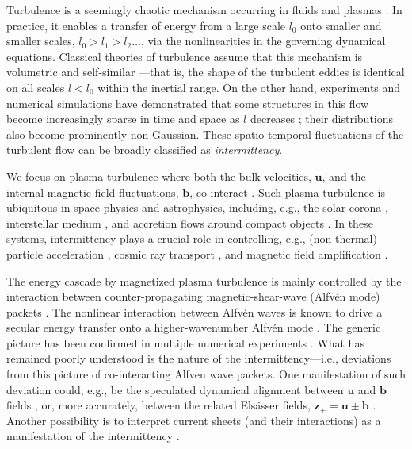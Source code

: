Turbulence is a seemingly chaotic mechanism occurring in fluids and plasmas \citep{davidson_turbulence_2015, biskamp_magnetohydrodynamic_2003}.
In practice, it enables a transfer of energy from a large scale $l_0$ onto smaller and smaller scales, $l_0 > l_1 > l_2 \ldots$, via the nonlinearities in the governing dynamical equations.
Classical theories of turbulence assume that this mechanism is volumetric and self-similar \citep{kolmogorov_local_1941}---that is, the shape of the turbulent eddies is identical on all scales $l < l_0$ within the inertial range.
On the other hand, experiments and numerical simulations have demonstrated that some structures in this flow become increasingly sparse in time and space as $l$ decreases \citep{she_universal_1994};
their distributions also become prominently non-Gaussian.
These spatio-temporal fluctuations of the turbulent flow can be broadly classified as \emph{intermittency}.

We focus on plasma turbulence where both the bulk velocities, $\mathbf{u}$, and the internal magnetic field fluctuations, $\mathbf{b}$, co-interact \citep{iroshnikov_turbulence_1964, kraichnan_inertial-range_1965, goldreich_toward_1995}.
Such plasma turbulence is ubiquitous in space physics and astrophysics, including, e.g., the solar corona \citep[e.g.,][]{parker_topological_1972, matthaeus_turbulence_1999}, interstellar medium \citep[e.g.,][]{larson_turbulence_1981, lithwick_compressible_2001}, and accretion flows around compact objects \citep[e.g.,][]{ripperda_magnetic_2020, nathanail_magnetic_2022}.
In these systems, intermittency plays a crucial role in controlling, e.g., (non-thermal) particle acceleration \citep[e.g.,][]{lemoine_particle_2023,nattila_radiative_2024}, cosmic ray transport \citep[e.g.,][]{fielding_plasmoid_2023,kempski_cosmic_2023}, and magnetic field amplification \citep[e.g.,][]{sironi_generation_2023,galishnikova_tearing_2022,beattie_magnetized_2024}.

The energy cascade by magnetized plasma turbulence is mainly controlled by the interaction between counter-propagating magnetic-shear-wave (Alfv\'en mode) packets \citep{goldreich_toward_1995}.
The nonlinear interaction between Alfv\'en waves is known to drive a secular energy transfer onto a higher-wavenumber Alfv\'en mode \citep{howes_alfven_2013,tenbarge_weak_2021}.
The generic picture has been confirmed in multiple numerical experiments \citep{nielson_alfven_2013,ripperda_weak_2021,nattila_heating_2022}.
What has remained poorly understood is the nature of the intermittency---i.e., deviations from this picture of co-interacting Alfven wave packets.
One manifestation of such deviation could, e.g., be the speculated dynamical alignment between $\mathbf{u}$ and $\mathbf{b}$ fields \citep{boldyrev_spectrum_2006}, or, more accurately, between the related Els\"asser fields, $\mathbf{z}_\pm = \mathbf{u} \pm \mathbf{b}$ \citep{mallet_refined_2015,chernoglazov_dynamic_2021}.
Another possibility is to interpret current sheets (and their interactions) as a manifestation of the intermittency \citep{zhou_spectrum_2023}.

